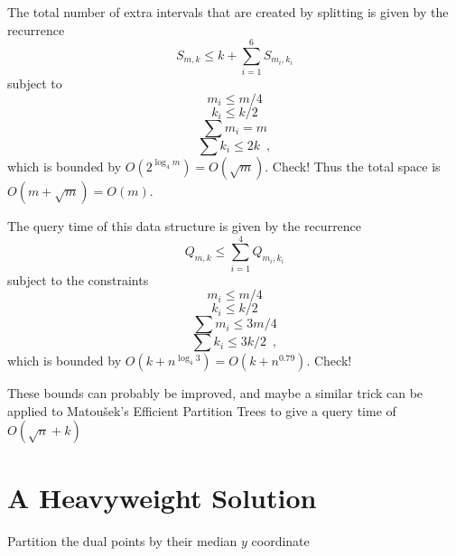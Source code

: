 \documentclass{article}
\begin{document}
The total number of extra intervals that are created by splitting is
given by the recurrence
\[
   S_{m,k} \le k + \sum_{i=1}^6 S_{m_i,k_i}
\]
subject to
\[ m_i\le m/4 \]
\[ k_i\le k/2 \]
\[ \sum m_i=m \]
\[ \sum k_i \le 2k \enspace , \] 
which is bounded by $O(2^{\log_4 m})=O(\sqrt{m})$.  Check! Thus the
total space is $O(m+\sqrt{m}) = O(m)$.

The query time of this data structure is given by the recurrence
\[
  Q_{m,k} \le \sum_{i=1}^4 Q_{m_i,k_i}
\]
subject to the constraints
\[ m_i\le m/4 \]
\[ k_i\le k/2 \]
\[ \sum m_i\le 3m/4 \]
\[ \sum k_i\le 3k/2 \enspace , \] 
which is bounded by $O(k+n^{\log_4 3})=O(k+n^{0.79})$.  Check!

These bounds can probably be improved, and maybe a similar trick can
be applied to Matou\v{s}ek's Efficient Partition Trees to give a query
time of $O(\sqrt{n}+k)$

\section{A Heavyweight Solution}

Partition the dual points by their median $y$ coordinate





\end{document}
